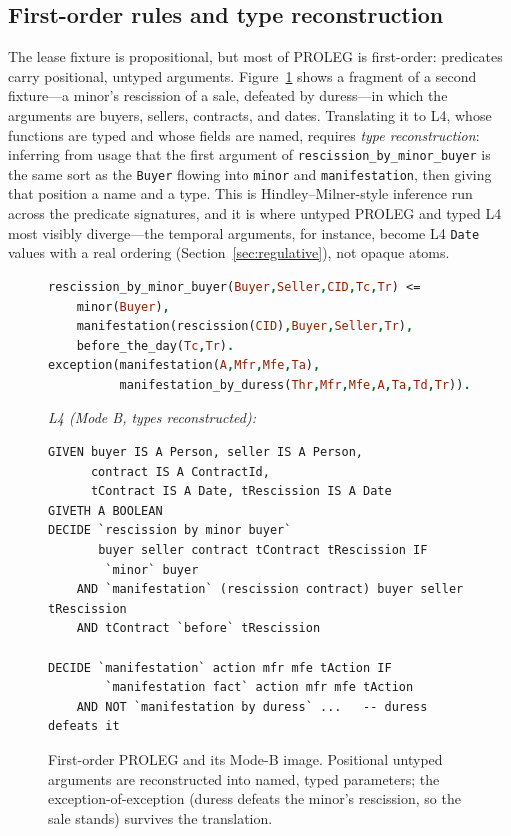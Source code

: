 \documentclass[sigconf,nonacm]{acmart}
\newcommand{\code}[1]{\texttt{\small #1}}
\begin{document}
\subsection{First-order rules and type reconstruction}
The lease fixture is propositional, but most of PROLEG is first-order:
predicates carry positional, untyped arguments. Figure~\ref{fig:minorduress}
shows a fragment of a second fixture---a minor's rescission of a sale,
defeated by duress---in which the arguments are buyers, sellers, contracts,
and dates. Translating it to L4, whose functions are typed and whose fields
are named, requires \emph{type reconstruction}: inferring from usage that the
first argument of \code{rescission\_by\_minor\_buyer} is the same sort as the
\code{Buyer} flowing into \code{minor} and \code{manifestation}, then giving
that position a name and a type. This is Hindley--Milner-style inference run
across the predicate signatures, and it is where untyped PROLEG and typed L4
most visibly diverge---the temporal arguments, for instance, become L4
\code{Date} values with a real ordering (Section~\ref{sec:regulative}), not
opaque atoms.

\begin{figure}[t]
\begin{lstlisting}[language=Prolog,basicstyle=\ttfamily\footnotesize,keywordstyle=\color{l4kw}\bfseries,commentstyle=\color{l4cmt}\itshape]
rescission_by_minor_buyer(Buyer,Seller,CID,Tc,Tr) <=
    minor(Buyer),
    manifestation(rescission(CID),Buyer,Seller,Tr),
    before_the_day(Tc,Tr).
exception(manifestation(A,Mfr,Mfe,Ta),
          manifestation_by_duress(Thr,Mfr,Mfe,A,Ta,Td,Tr)).
\end{lstlisting}
\noindent\textit{\footnotesize L4 (Mode B, types reconstructed):}
\begin{lstlisting}
GIVEN buyer IS A Person, seller IS A Person,
      contract IS A ContractId,
      tContract IS A Date, tRescission IS A Date
GIVETH A BOOLEAN
DECIDE `rescission by minor buyer`
       buyer seller contract tContract tRescission IF
        `minor` buyer
    AND `manifestation` (rescission contract) buyer seller tRescission
    AND tContract `before` tRescission

DECIDE `manifestation` action mfr mfe tAction IF
        `manifestation fact` action mfr mfe tAction
    AND NOT `manifestation by duress` ...   -- duress defeats it
\end{lstlisting}
\caption{First-order PROLEG and its Mode-B image. Positional untyped
arguments are reconstructed into named, typed parameters; the
exception-of-exception (duress defeats the minor's rescission, so the sale
stands) survives the translation.}
\label{fig:minorduress}
\end{figure}
\end{document}
